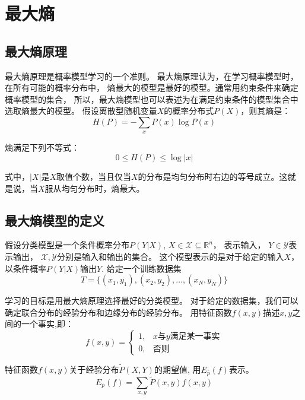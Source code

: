 \documentclass[a4paper,12pt]{book}
\begin{document}
    \chapter{最大熵}

    \section{最大熵原理}
    最大熵原理是概率模型学习的一个准则。
    最大熵原理认为，在学习概率模型时，在所有可能的概率分布中，
    熵最大的模型是最好的模型。通常用约束条件来确定概率模型的集合，
    所以，最大熵模型也可以表述为在满足约束条件的模型集合中选取熵最大的模型。
    假设离散型随机变量$X$的概率分布式$P(X)$，则其熵是：
    \begin{equation}
        H(P)=-\sum_x P(x) \log P(x)
    \end{equation}


    熵满足下列不等式：
    \begin{equation}
        0 \le H(P) \le \log|x|
    \end{equation}

    式中，$|X|$是$X$取值个数，当且仅当$X$的分布是均匀分布时右边的等号成立。这就是说，当$X$服从均匀分布时，熵最大。

    \section{最大熵模型的定义}

    假设分类模型是一个条件概率分布$P(Y|X)$,
    $X \in \mathcal{X} \subseteq \mathbb{R}^n$， 
    表示输入， $Y \in \mathcal{Y}$表示输出，
    $\mathcal{X},\mathcal{Y}$分别是输入和输出的集合。
    这个模型表示的是对于给定的输入$X$，以条件概率$P(Y|X)$输出$Y$.
    给定一个训练数据集
    \begin{equation}
        T = \{(x_1, y_1),(x_2, y_2),\dots,(x_N, y_N)\}
    \end{equation}

    学习的目标是用最大熵原理选择最好的分类模型。
    对于给定的数据集，我们可以确定联合分布的经验分布和边缘分布的经验分布。
    用特征函数$f(x,y)$描述$x,y$之间的一个事实,即：
    $$
    f(x, y) = \left\{ \begin{array}{ll}
    1, & x与y满足某一事实 \\
    0, &否则
    \end{array} \right. 
    $$

    特征函数$f(x,y)$关于经验分布$\widetilde{P}(X,Y)$的期望值, 
    用$E_{\bar{p}}(f)$表示。
    \begin{equation}
        E_{\bar{p}}(f) = \sum_{x, y} \widetilde{P}(x,y) f(x,y)
    \end{equation}
\end{document}
